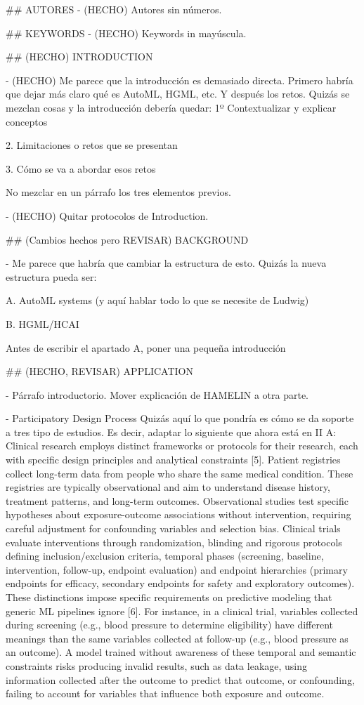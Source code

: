 ## AUTORES
- (HECHO) Autores sin números.

## KEYWORDS
- (HECHO) Keywords in mayúscula.

## (HECHO) INTRODUCTION

- (HECHO) Me parece que la introducción es demasiado directa. Primero habría que dejar más claro qué es AutoML, HGML, etc. Y después los retos. Quizás se mezclan cosas y la introducción debería quedar:
1º Contextualizar y explicar conceptos

2. Limitaciones o retos que se presentan

3. Cómo se va a abordar esos retos

No mezclar en un párrafo los tres elementos previos.

- (HECHO) Quitar protocolos de Introduction.

## (Cambios hechos pero REVISAR) BACKGROUND

- Me parece que habría que cambiar la estructura de esto. Quizás la nueva estructura pueda ser:

A. AutoML systems (y aquí hablar todo lo que se necesite de Ludwig)

B. HGML/HCAI

Antes de escribir el apartado A, poner una pequeña introducción


## (HECHO, REVISAR) APPLICATION

- Párrafo introductorio. Mover explicación de HAMELIN a otra parte.

- Participatory Design Process
Quizás aquí lo que pondría es cómo se da soporte a tres tipo de estudios. Es decir, adaptar lo siguiente que ahora está en II A: Clinical research employs distinct frameworks or protocols for their research, each with specific design principles and
analytical constraints [5]. Patient registries collect long-term data from people who share the same medical condition. These
registries are typically observational and aim to understand disease history, treatment patterns, and long-term outcomes.
Observational studies test specific hypotheses about exposure-outcome associations without intervention, requiring careful
adjustment for confounding variables and selection bias. Clinical trials evaluate interventions through randomization, blinding
and rigorous protocols defining inclusion/exclusion criteria, temporal phases (screening, baseline, intervention, follow-up,
endpoint evaluation) and endpoint hierarchies (primary endpoints for efficacy, secondary endpoints for safety and exploratory
outcomes).
These distinctions impose specific requirements on predictive modeling that generic ML pipelines ignore [6]. For instance,
in a clinical trial, variables collected during screening (e.g., blood pressure to determine eligibility) have different meanings
than the same variables collected at follow-up (e.g., blood pressure as an outcome). A model trained without awareness of
these temporal and semantic constraints risks producing invalid results, such as data leakage, using information collected after
the outcome to predict that outcome, or confounding, failing to account for variables that influence both exposure and outcome.

